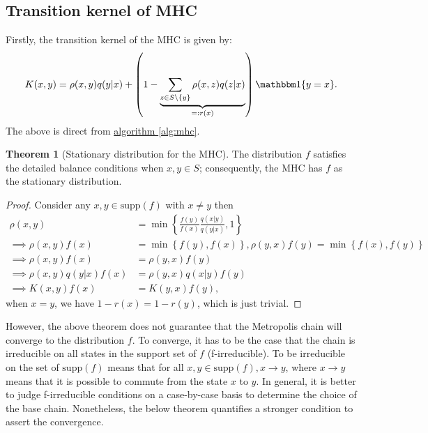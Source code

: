 \documentclass[]{article}
\theoremstyle{definition}
\newtheorem{theorem}{Theorem}       %
\begin{document}
    \subsection{Transition kernel of MHC}
        Firstly, the transition kernel of the MHC is given by: 
        \begin{align*}
            K(x, y) = 
            \rho(x, y)q(y|x) + 
            \left(
                1 - \underbrace{\sum_{z \in S\setminus \{y\} }^{}\rho(x, z)q(z|x)}_{=:r(x)}
            \right) \mathbbm 1\{y = x\}. 
        \end{align*}
        The above is direct from \hyperref[alg:mhc]{algorithm \ref*{alg:mhc}}. 
        \begin{theorem}[Stationary distribution for the MHC]\label{thm:sat_distr}
            The distribution $f$ satisfies the detailed balance conditions when $x, y\in S$; consequently, the MHC has $f$ as the stationary distribution. 
        \end{theorem}
        \begin{proof}
            Consider any $x, y\in \text{supp}(f)$ with $x\neq y$ then
            \begin{align*}
                \rho(x, y) &= \min\left\lbrace
                \frac{f(y)}{f(x)}\frac{q(x|y)}{q(y|x)}, 1
                \right\rbrace
                \\
                \implies
                \rho(x, y)f(x) &= \min\left\lbrace
                    f(y), f(x)
                \right\rbrace, \rho(y, x) f(y) = 
                \min\left\lbrace
                    f(x), f(y)
                \right\rbrace
                \\
                \implies
                \rho(x, y)f(x) &= \rho(y, x)f(y)
                \\
                \implies
                \rho(x, y)q(y|x)f(x) &= 
                \rho(y, x)q(x|y)f(y)
                \\
                \implies
                K(x, y)f(x) &= K(y, x)f(y), 
            \end{align*}
            when $x = y$, we have $1 - r(x)= 1 - r(y)$, which is just trivial. 
        \end{proof}
        However, the above theorem does not guarantee that the Metropolis chain will converge to the distribution $f$. To converge, it has to be the case that the chain is irreducible on all states in the support set of $f$ (f-irreducible). To be irreducible on the set of $\text{supp}(f)$ means that for all $x, y \in \text{supp}(f), x \rightarrow y$, where $x\rightarrow y$ means that it is possible to commute from the state $x$ to $y$. In general, it is better to judge f-irreducible conditions on a case-by-case basis to determine the choice of the base chain. Nonetheless, the below theorem quantifies a stronger condition to assert the convergence. 
\end{document}
